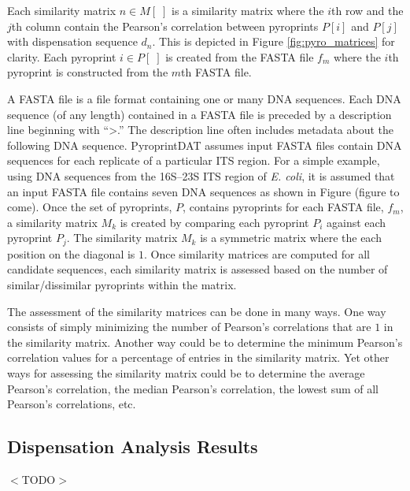 \documentclass[12pt]{ucthesis}
\begin{document}
      Each similarity matrix $n \in M[\;]$ is a similarity matrix where the
      $i$th row and the $j$th column contain the Pearson's correlation between
      pyroprints $P[i]$ and $P[j]$ with dispensation sequence $d_n$. This is
      depicted in Figure \ref{fig:pyro_matrices} for clarity. Each pyroprint
      $i \in P[\;]$ is created from the FASTA file $f_m$ where the $i$th
      pyroprint is constructed from the $m$th FASTA file.

      A FASTA file is a file format containing one or many DNA sequences. Each DNA
      sequence (of any length) contained in a FASTA file is preceded by a
      description line beginning with ``\textgreater.'' The description line often includes
      metadata about the following DNA sequence. PyroprintDAT assumes input FASTA
      files contain DNA sequences for each replicate of a particular ITS region.
      For a simple example, using DNA sequences from the 16S--23S ITS region of
      \textit{E. coli}, it is assumed that an input FASTA file contains seven DNA
      sequences as shown in Figure (figure to come). Once the set of pyroprints,
      $P$, contains pyroprints for each FASTA file, $f_m$, a similarity matrix
      $M_k$ is created by comparing each pyroprint $P_i$ against each pyroprint
      $P_j$. The similarity matrix $M_k$ is a symmetric matrix where the each
      position on the diagonal is $1$. Once similarity matrices are computed for
      all candidate sequences, each similarity matrix is assessed based on the
      number of similar/dissimilar pyroprints within the matrix.

      The assessment of the similarity matrices can be done in many ways. One way
      consists of simply minimizing the number of Pearson's correlations that are
      $1$ in the similarity matrix. Another way could be to determine the minimum
      Pearson's correlation values for a percentage of entries in the similarity
      matrix. Yet other ways for assessing the similarity matrix could be to
      determine the average Pearson's correlation, the median Pearson's
      correlation, the lowest sum of all Pearson's correlations, etc.

      \subsection{Dispensation Analysis Results}\label{sec:dat_results}
      $<$TODO$>$
\end{document}

